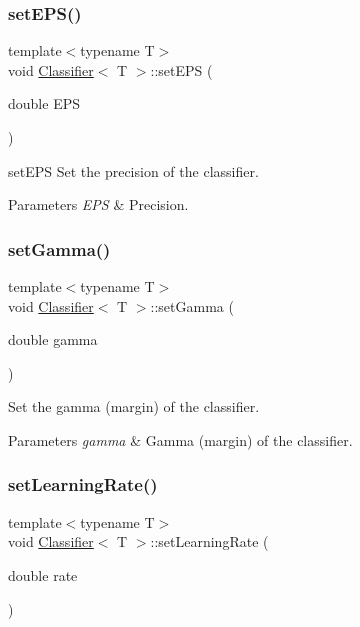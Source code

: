 \subsubsection{\texorpdfstring{set\+E\+P\+S()}{setEPS()}}
{\footnotesize\ttfamily template$<$typename T$>$ \\
void \mbox{\hyperlink{class_classifier}{Classifier}}$<$ T $>$\+::set\+E\+PS (\begin{DoxyParamCaption}\item[{double}]{E\+PS }\end{DoxyParamCaption})\hspace{0.3cm}{\ttfamily [inline]}}



set\+E\+PS Set the precision of the classifier. 


\begin{DoxyParams}{Parameters}
{\em E\+PS} & Precision. \\
\hline
\end{DoxyParams}
\mbox{\label{class_classifier_a8ce9a9a19a9deceb12e39e54ef595650}} 
\subsubsection{\texorpdfstring{set\+Gamma()}{setGamma()}}
{\footnotesize\ttfamily template$<$typename T$>$ \\
void \mbox{\hyperlink{class_classifier}{Classifier}}$<$ T $>$\+::set\+Gamma (\begin{DoxyParamCaption}\item[{double}]{gamma }\end{DoxyParamCaption})\hspace{0.3cm}{\ttfamily [inline]}}



Set the gamma (margin) of the classifier. 


\begin{DoxyParams}{Parameters}
{\em gamma} & Gamma (margin) of the classifier. \\
\hline
\end{DoxyParams}
\mbox{\label{class_classifier_ae705171568ea2066b619609af614129e}} 
\subsubsection{\texorpdfstring{set\+Learning\+Rate()}{setLearningRate()}}
{\footnotesize\ttfamily template$<$typename T$>$ \\
void \mbox{\hyperlink{class_classifier}{Classifier}}$<$ T $>$\+::set\+Learning\+Rate (\begin{DoxyParamCaption}\item[{double}]{rate }\end{DoxyParamCaption})\hspace{0.3cm}{\ttfamily [inline]}}



